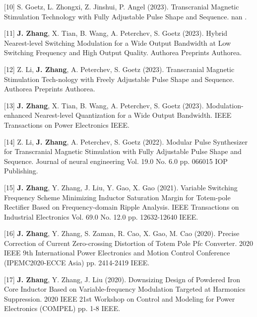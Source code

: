[10] S. Goetz, L. Zhongxi, Z. Jinshui, P. Angel (2023). Transcranial Magnetic Stimulation Technology with Fully Adjustable Pulse Shape and Sequence. nan    .

[11] \textbf{J. Zhang}, X. Tian, B. Wang, A. Peterchev, S. Goetz (2023). Hybrid Nearest-level Switching Modulation for a Wide Output Bandwidth at Low Switching Frequency and High Output Quality. Authorea Preprints    Authorea.

[12] Z. Li, \textbf{J. Zhang}, A. Peterchev, S. Goetz (2023). Transcranial Magnetic Stimulation Tech-nology with Freely Adjustable Pulse Shape and Sequence. Authorea Preprints    Authorea.

[13] \textbf{J. Zhang}, X. Tian, B. Wang, A. Peterchev, S. Goetz (2023). Modulation-enhanced Nearest-level Quantization for a Wide Output Bandwidth. IEEE Transactions on Power Electronics    IEEE.

[14] Z. Li, \textbf{J. Zhang}, A. Peterchev, S. Goetz (2022). Modular Pulse Synthesizer for Transcranial Magnetic Stimulation with Fully Adjustable Pulse Shape and Sequence. Journal of neural engineering Vol. 19.0 No. 6.0 pp. 066015 IOP Publishing.

[15] \textbf{J. Zhang}, Y. Zhang, J. Liu, Y. Gao, X. Gao (2021). Variable Switching Frequency Scheme Minimizing Inductor Saturation Margin for Totem-pole Rectifier Based on Frequency-domain Ripple Analysis. IEEE Transactions on Industrial Electronics Vol. 69.0 No. 12.0 pp. 12632-12640 IEEE.

[16] \textbf{J. Zhang}, Y. Zhang, S. Zaman, R. Cao, X. Gao, M. Cao (2020). Precise Correction of Current Zero-crossing Distortion of Totem Pole Pfc Converter. 2020 IEEE 9th International Power Electronics and Motion Control Conference (IPEMC2020-ECCE Asia)   pp. 2414-2419 IEEE.

[17] \textbf{J. Zhang}, Y. Zhang, J. Liu (2020). Downsizing Design of Powdered Iron Core Inductor Based on Variable-frequency Modulation Targeted at Harmonics Suppression. 2020 IEEE 21st Workshop on Control and Modeling for Power Electronics (COMPEL)   pp. 1-8 IEEE.